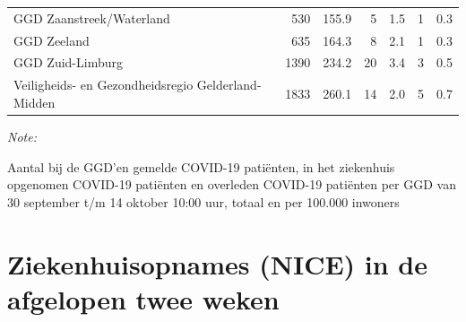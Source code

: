 \documentclass[
  english,
  man,floatsintext]{apa6}
\begin{document}
\begin{table}
\begin{threeparttable}
\begin{tabular}{lrrrrrr}
GGD Zaanstreek/Waterland & 530 & 155.9 & 5 & 1.5 & 1 & 0.3\\
GGD Zeeland & 635 & 164.3 & 8 & 2.1 & 1 & 0.3\\
GGD Zuid-Limburg & 1390 & 234.2 & 20 & 3.4 & 3 & 0.5\\
Veiligheids- en Gezondheidsregio Gelderland-Midden & 1833 & 260.1 & 14 & 2.0 & 5 & 0.7\\
\bottomrule
\end{tabular}
\begin{tablenotes}
\item \textit{Note: } 
\item Aantal bij de GGD’en gemelde COVID-19 patiënten, in het ziekenhuis opgenomen COVID-19 patiënten en overleden COVID-19 patiënten per GGD van 30 september t/m 14 oktober 10:00 uur, totaal en per 100.000 inwoners
\end{tablenotes}
\end{threeparttable}
\endgroup{}
\end{table}

\newpage

\hypertarget{ziekenhuisopnames-nice-in-de-afgelopen-twee-weken}{%
\section{Ziekenhuisopnames (NICE) in de afgelopen twee weken}\label{ziekenhuisopnames-nice-in-de-afgelopen-twee-weken}}
\end{document}
